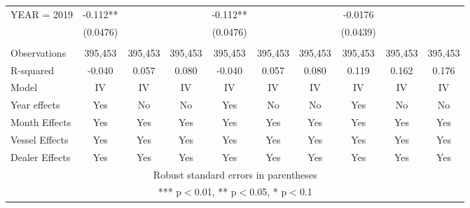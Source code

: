 \begin{tabular}{lccccccccc}
YEAR = 2019 & -0.112** &  &  & -0.112** &  &  & -0.0176 &  &  \\
 & (0.0476) &  &  & (0.0476) &  &  & (0.0439) &  &  \\
 &  &  &  &  &  &  &  &  &  \\
Observations & 395,453 & 395,453 & 395,453 & 395,453 & 395,453 & 395,453 & 395,453 & 395,453 & 395,453 \\
R-squared & -0.040 & 0.057 & 0.080 & -0.040 & 0.057 & 0.080 & 0.119 & 0.162 & 0.176 \\
Model & IV & IV & IV & IV & IV & IV & IV & IV & IV \\
Year effects & Yes & No & No & Yes & No & No & Yes & No & No \\
Month Effects & Yes & Yes & Yes & Yes & Yes & Yes & Yes & Yes & Yes \\
Vessel Effects & Yes & Yes & Yes & Yes & Yes & Yes & Yes & Yes & Yes \\
 Dealer Effects & Yes & Yes & Yes & Yes & Yes & Yes & Yes & Yes & Yes \\ \hline
\multicolumn{10}{c}{ Robust standard errors in parentheses} \\
\multicolumn{10}{c}{ *** p$<$0.01, ** p$<$0.05, * p$<$0.1} \\
\end{tabular}
